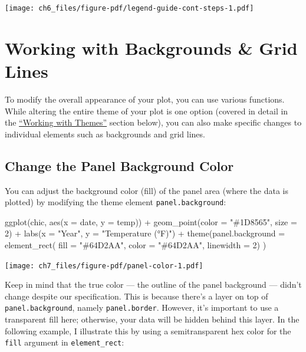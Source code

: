 \documentclass[
  letterpaper,
]{scrbook}
\newenvironment{Shaded}{\begin{snugshade}}{\end{snugshade}}
\newcommand{\AttributeTok}[1]{\textcolor[rgb]{0.40,0.45,0.13}{#1}}
\newcommand{\DecValTok}[1]{\textcolor[rgb]{0.68,0.00,0.00}{#1}}
\newcommand{\FunctionTok}[1]{\textcolor[rgb]{0.28,0.35,0.67}{#1}}
\newcommand{\NormalTok}[1]{\textcolor[rgb]{0.00,0.23,0.31}{#1}}
\newcommand{\SpecialCharTok}[1]{\textcolor[rgb]{0.37,0.37,0.37}{#1}}
\newcommand{\StringTok}[1]{\textcolor[rgb]{0.13,0.47,0.30}{#1}}
\begin{document}
\texttt{[image: ch6\_files/figure-pdf/legend-guide-cont-steps-1.pdf]}


\chapter{Working with Backgrounds \& Grid Lines}\label{style}

To modify the overall appearance of your plot, you can use various
functions. While altering the entire theme of your plot is one option
(covered in detail in the \hyperref[themes]{``Working with Themes''}
section below), you can also make specific changes to individual
elements such as backgrounds and grid lines.

\section{Change the Panel Background
Color}\label{change-the-panel-background-color}

You can adjust the background color (fill) of the panel area (where the
data is plotted) by modifying the theme element
\texttt{panel.background}:

\begin{Shaded}
\begin{Highlighting}[]
\FunctionTok{ggplot}\NormalTok{(chic, }\FunctionTok{aes}\NormalTok{(}\AttributeTok{x =}\NormalTok{ date, }\AttributeTok{y =}\NormalTok{ temp)) }\SpecialCharTok{+}
  \FunctionTok{geom\_point}\NormalTok{(}\AttributeTok{color =} \StringTok{"\#1D8565"}\NormalTok{, }\AttributeTok{size =} \DecValTok{2}\NormalTok{) }\SpecialCharTok{+}
  \FunctionTok{labs}\NormalTok{(}\AttributeTok{x =} \StringTok{"Year"}\NormalTok{, }\AttributeTok{y =} \StringTok{"Temperature (°F)"}\NormalTok{) }\SpecialCharTok{+}
  \FunctionTok{theme}\NormalTok{(}\AttributeTok{panel.background =} \FunctionTok{element\_rect}\NormalTok{(}
    \AttributeTok{fill =} \StringTok{"\#64D2AA"}\NormalTok{, }\AttributeTok{color =} \StringTok{"\#64D2AA"}\NormalTok{, }\AttributeTok{linewidth =} \DecValTok{2}\NormalTok{)}
\NormalTok{  )}
\end{Highlighting}
\end{Shaded}

\texttt{[image: ch7\_files/figure-pdf/panel-color-1.pdf]}

Keep in mind that the true color --- the outline of the panel background
--- didn't change despite our specification. This is because there's a
layer on top of \texttt{panel.background}, namely \texttt{panel.border}.
However, it's important to use a transparent fill here; otherwise, your
data will be hidden behind this layer. In the following example, I
illustrate this by using a semitransparent hex color for the
\texttt{fill} argument in \texttt{element\_rect}:
\end{document}
